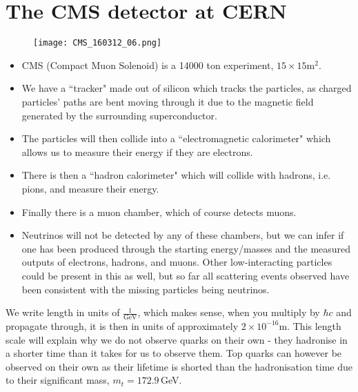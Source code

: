 \documentclass[a4paper, 11pt, normalem]{report}
\begin{document}
\section{The CMS detector at CERN}
\begin{figure}[H]
    \centering
    \texttt{[image: CMS\_160312\_06.png]}
\end{figure}
\begin{itemize}
    \item CMS (Compact Muon Solenoid) is a 14000 ton experiment, $15\times15$m$^2$.
    \item We have a ``tracker" made out of silicon which tracks the particles, as charged particles' paths are bent moving through it due to the magnetic field generated by the surrounding superconductor.
    \item The particles will then collide into a ``electromagnetic calorimeter" which allows us to measure their energy if they are electrons.
    \item There is then a ``hadron calorimeter" which will collide with hadrons, i.e. pions, and measure their energy.
    \item Finally there is a muon chamber, which of course detects muons.
    \item Neutrinos will not be detected by any of these chambers, but we can infer if one has been produced through the starting energy/masses and the measured outputs of electrons, hadrons, and muons.
        Other low-interacting particles could be present in this as well, but so far all scattering events observed have been consistent with the missing particles being neutrinos.
\end{itemize}
We write length in units of $\frac{1}{\text{GeV}}$, which makes sense, when you multiply by $\hbar c$ and propagate through, it is then in units of approximately $2\times10^{-16}$m.
This length scale will explain why we do not observe quarks on their own - they hadronise in a shorter time than it takes for us to observe them.
Top quarks can however be observed on their own as their lifetime is shorted than the hadronisation time due to their significant mass, $m_t=172.9\,$GeV.
\end{document}
